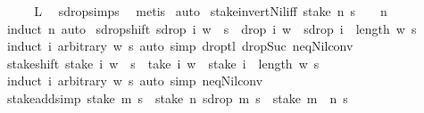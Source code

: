\begin{isabellebody}
\ \ \isamarkupfalse%
\ \isamarkupfalse%
\ {\isacharquery}L\ \isamarkupfalse%
\ sdrop{\isachardot}simps{\isacharparenleft}{}{\isacharparenright}\ \isamarkupfalse%
\ metis\isanewline
{}\isamarkupfalse%
\ auto%
\endisatagproof
{\isafoldproof}%
%
\isadelimproof
\isanewline
%
\endisadelimproof
\isanewline
{}\isamarkupfalse%
\ stake{\isacharunderscore}invert{\isacharunderscore}Nil{\isacharbrackleft}iff{\isacharbrackright}{\isacharcolon}\ {\isachardoublequoteopen}stake\ n\ s\ {\isacharequal}\ {\isacharbrackleft}{\isacharbrackright}\ {\isasymlongleftrightarrow}\ n\ {\isacharequal}\ {}{\isachardoublequoteclose}\isanewline
%
\isadelimproof
\ \ %
\endisadelimproof
%
\isatagproof
{}\isamarkupfalse%
\ {\isacharparenleft}induct\ n{\isacharparenright}\ auto%
\endisatagproof
{\isafoldproof}%
%
\isadelimproof
\isanewline
%
\endisadelimproof
\isanewline
{}\isamarkupfalse%
\ sdrop{\isacharunderscore}shift{\isacharcolon}\ {\isachardoublequoteopen}sdrop\ i\ {\isacharparenleft}w\ {\isacharat}{\isacharminus}\ s{\isacharparenright}\ {\isacharequal}\ drop\ i\ w\ {\isacharat}{\isacharminus}\ sdrop\ {\isacharparenleft}i\ {\isacharminus}\ length\ w{\isacharparenright}\ s{\isachardoublequoteclose}\isanewline
%
\isadelimproof
\ \ %
\endisadelimproof
%
\isatagproof
{}\isamarkupfalse%
\ {\isacharparenleft}induct\ i\ arbitrary{\isacharcolon}\ w\ s{\isacharparenright}\ {\isacharparenleft}auto\ simp{\isacharcolon}\ drop{\isacharunderscore}tl\ drop{\isacharunderscore}Suc\ neq{\isacharunderscore}Nil{\isacharunderscore}conv{\isacharparenright}%
\endisatagproof
{\isafoldproof}%
%
\isadelimproof
\isanewline
%
\endisadelimproof
\isanewline
{}\isamarkupfalse%
\ stake{\isacharunderscore}shift{\isacharcolon}\ {\isachardoublequoteopen}stake\ i\ {\isacharparenleft}w\ {\isacharat}{\isacharminus}\ s{\isacharparenright}\ {\isacharequal}\ take\ i\ w\ {\isacharat}\ stake\ {\isacharparenleft}i\ {\isacharminus}\ length\ w{\isacharparenright}\ s{\isachardoublequoteclose}\isanewline
%
\isadelimproof
\ \ %
\endisadelimproof
%
\isatagproof
{}\isamarkupfalse%
\ {\isacharparenleft}induct\ i\ arbitrary{\isacharcolon}\ w\ s{\isacharparenright}\ {\isacharparenleft}auto\ simp{\isacharcolon}\ neq{\isacharunderscore}Nil{\isacharunderscore}conv{\isacharparenright}%
\endisatagproof
{\isafoldproof}%
%
\isadelimproof
\isanewline
%
\endisadelimproof
\isanewline
{}\isamarkupfalse%
\ stake{\isacharunderscore}add{\isacharbrackleft}simp{\isacharbrackright}{\isacharcolon}\ {\isachardoublequoteopen}stake\ m\ s\ {\isacharat}\ stake\ n\ {\isacharparenleft}sdrop\ m\ s{\isacharparenright}\ {\isacharequal}\ stake\ {\isacharparenleft}m\ {\isacharplus}\ n{\isacharparenright}\ s{\isachardoublequoteclose}\isanewline

\end{isabellebody}
